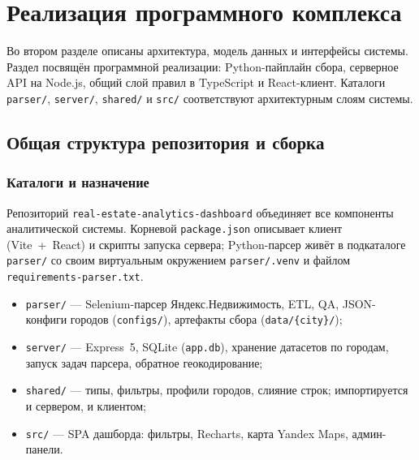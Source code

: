 \section{Реализация программного комплекса}

Во втором разделе описаны архитектура, модель данных и интерфейсы системы. Раздел посвящён программной реализации: Python-пайплайн сбора, серверное API на Node.js, общий слой правил в TypeScript и React-клиент. Каталоги \texttt{parser/}, \texttt{server/}, \texttt{shared/} и \texttt{src/} соответствуют архитектурным слоям системы.

\newcommand{\codelistingcaption}[1]{%
  \refstepcounter{codelisting}%
  \par\vspace{1.5\baselineskip}%
  \nopagebreak[4]%
  \begingroup\sloppy\raggedright\hbadness=10000\emergencystretch=3em
  \noindent\textbf{Листинг~3.\arabic{codelisting}.} #1\par
  \endgroup\vspace{0.8\baselineskip}%
}

\subsection{Общая структура репозитория и сборка}

\subsubsection{Каталоги и назначение}

Репозиторий \texttt{real-estate-analytics-dashboard} объединяет все компоненты аналитической системы. Корневой \texttt{package.json} описывает клиент (Vite~+~React) и скрипты запуска сервера; Python-парсер живёт в подкаталоге \texttt{parser/} со своим виртуальным окружением \texttt{parser/.venv} и файлом \texttt{requirements-parser.txt}.

\begin{itemize}
    \item \texttt{parser/} --- Selenium-парсер Яндекс.Недвижимость, ETL, QA, JSON-конфиги городов (\texttt{configs/}), артефакты сбора (\texttt{data/\{city\}/});
    \item \texttt{server/} --- Express~5, SQLite (\texttt{app.db}), хранение датасетов по городам, запуск задач парсера, обратное геокодирование;
    \item \texttt{shared/} --- типы, фильтры, профили городов, слияние строк; импортируется и сервером, и клиентом;
    \item \texttt{src/} --- SPA дашборда: фильтры, Recharts, карта Yandex Maps, админ-панели.
\end{itemize}

